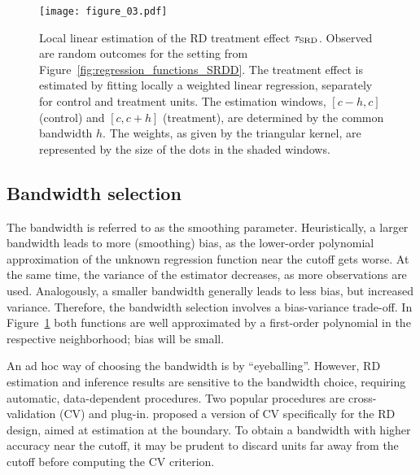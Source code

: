 \begin{figure}
	\centering
	\texttt{[image: figure\_03.pdf]}
	\caption{Local linear estimation of the RD treatment effect $\tau_{\textup{SRD}}$.
			 Observed are random outcomes for the setting from Figure~\ref{fig:regression_functions_SRDD}.
		 	 The treatment effect is estimated by fitting locally a weighted linear regression, separately for control and treatment units.
	 	 	 The estimation windows, $[c - h, c]$ (control) and $[c, c + h]$ (treatment), are determined by the common bandwidth $h$.
 	 	 	 The weights, as given by the triangular kernel, are represented by the size of the dots in the shaded windows.}
	\label{fig:ll_estimation}
\end{figure}

\subsection{Bandwidth selection}

The bandwidth is referred to as the smoothing parameter.
Heuristically, a larger bandwidth leads to more (smoothing) bias, as the lower-order polynomial approximation of the unknown regression function near the cutoff gets worse.
At the same time, the variance of the estimator decreases, as more observations are used.
Analogously, a smaller bandwidth generally leads to less bias, but increased variance.
Therefore, the bandwidth selection involves a bias-variance trade-off.
In Figure~\ref{fig:ll_estimation} both functions are well approximated by a first-order polynomial in the respective neighborhood;
bias will be small.

An ad hoc way of choosing the bandwidth is by \enquote{eyeballing}.
However, RD estimation and inference results are sensitive to the bandwidth choice, requiring automatic, data-dependent procedures.
Two popular procedures are cross-validation (CV) and plug-in.
\textcite{Imbens_2008} proposed a version of CV specifically for the RD design, aimed at estimation at the boundary.
To obtain a bandwidth with higher accuracy near the cutoff,
it may be prudent to discard units far away from the cutoff before computing the CV criterion. 

